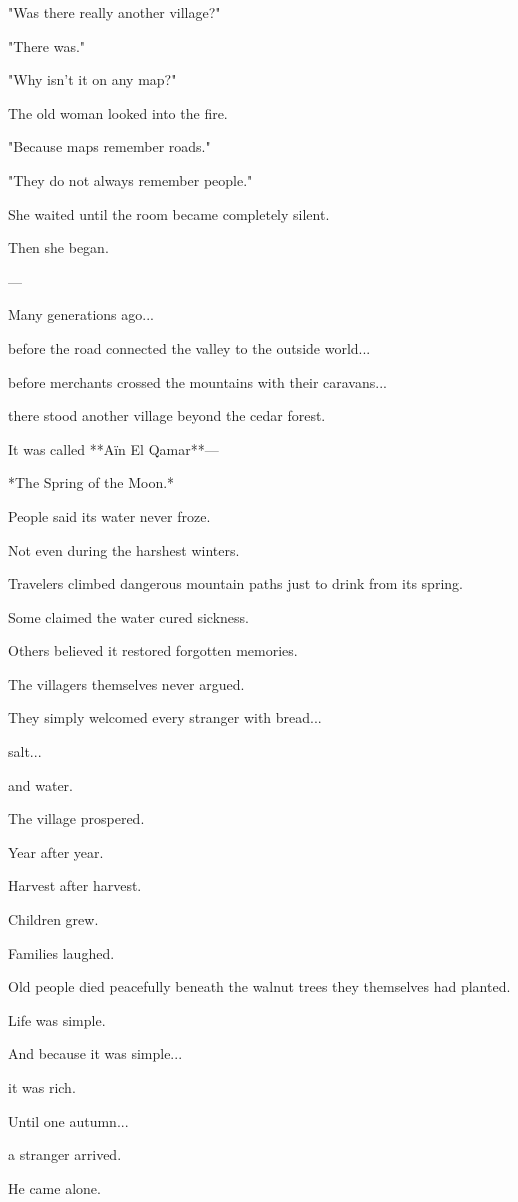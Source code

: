 \documentclass[12pt,openany]{book}
\begin{document}
"Was there really another village?"

"There was."

"Why isn't it on any map?"

The old woman looked into the fire.

"Because maps remember roads."

"They do not always remember people."

She waited until the room became completely silent.

Then she began.

---

Many generations ago...

before the road connected the valley to the outside world...

before merchants crossed the mountains with their caravans...

there stood another village beyond the cedar forest.

It was called **Aïn El Qamar**—

*The Spring of the Moon.*

People said its water never froze.

Not even during the harshest winters.

Travelers climbed dangerous mountain paths just to drink from its spring.

Some claimed the water cured sickness.

Others believed it restored forgotten memories.

The villagers themselves never argued.

They simply welcomed every stranger with bread...

salt...

and water.

The village prospered.

Year after year.

Harvest after harvest.

Children grew.

Families laughed.

Old people died peacefully beneath the walnut trees they themselves had planted.

Life was simple.

And because it was simple...

it was rich.

Until one autumn...

a stranger arrived.

He came alone.
\end{document}
